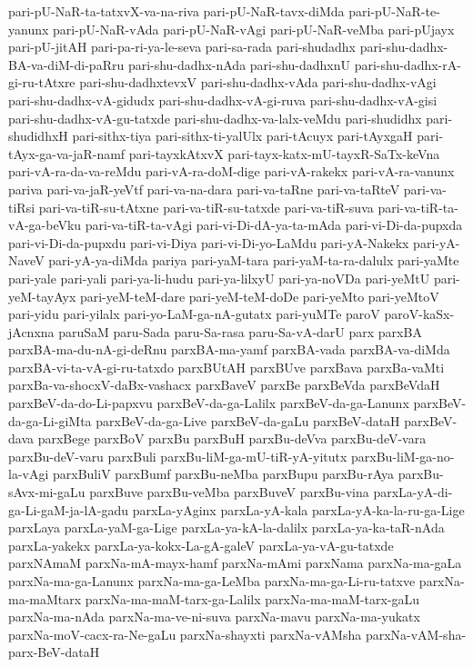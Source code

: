 {pari-pU-NaR-ta-tatxvX-va-na-riva
pari-pU-NaR-tavx-diMda
pari-pU-NaR-te-yanunx
pari-pU-NaR-vAda
pari-pU-NaR-vAgi
pari-pU-NaR-veMba
pari-pUjayx
pari-pU-jitAH
pari-pa-ri-ya-le-seva
pari-sa-rada
pari-shudadhx
pari-shu-dadhx-BA-va-diM-di-paRru
pari-shu-dadhx-nAda
pari-shu-dadhxnU
pari-shu-dadhx-rA-gi-ru-tAtxre
pari-shu-dadhxtevxV
pari-shu-dadhx-vAda
pari-shu-dadhx-vAgi
pari-shu-dadhx-vA-gidudx
pari-shu-dadhx-vA-gi-ruva
pari-shu-dadhx-vA-gisi
pari-shu-dadhx-vA-gu-tatxde
pari-shu-dadhx-va-lalx-veMdu
pari-shudidhx
pari-shudidhxH
pari-sithx-tiya
pari-sithx-ti-yalUlx
pari-tAcuyx
pari-tAyxgaH
pari-tAyx-ga-va-jaR-namf
pari-tayxkAtxvX
pari-tayx-katx-mU-tayxR-SaTx-keVna
pari-vA-ra-da-va-reMdu
pari-vA-ra-doM-dige
pari-vA-rakekx
pari-vA-ra-vanunx
pariva
pari-va-jaR-yeVtf
pari-va-na-dara
pari-va-taRne
pari-va-taRteV
pari-va-tiRsi
pari-va-tiR-su-tAtxne
pari-va-tiR-su-tatxde
pari-va-tiR-suva
pari-va-tiR-ta-vA-ga-beVku
pari-va-tiR-ta-vAgi
pari-vi-Di-dA-ya-ta-mAda
pari-vi-Di-da-pupxda
pari-vi-Di-da-pupxdu
pari-vi-Diya
pari-vi-Di-yo-LaMdu
pari-yA-Nakekx
pari-yA-NaveV
pari-yA-ya-diMda
pariya
pari-yaM-tara
pari-yaM-ta-ra-dalulx
pari-yaMte
pari-yale
pari-yali
pari-ya-li-hudu
pari-ya-lilxyU
pari-ya-noVDa
pari-yeMtU
pari-yeM-tayAyx
pari-yeM-teM-dare
pari-yeM-teM-doDe
pari-yeMto
pari-yeMtoV
pari-yidu
pari-yilalx
pari-yo-LaM-ga-nA-gutatx
pari-yuMTe
paroV
paroV-kaSx-jAcnxna
paruSaM
paru-Sada
paru-Sa-rasa
paru-Sa-vA-darU
parx
parxBA
parxBA-ma-du-nA-gi-deRnu
parxBA-ma-yamf
parxBA-vada
parxBA-va-diMda
parxBA-vi-ta-vA-gi-ru-tatxdo
parxBUtAH
parxBUve
parxBava
parxBa-vaMti
parxBa-va-shocxV-daBx-vashacx
parxBaveV
parxBe
parxBeVda
parxBeVdaH
parxBeV-da-do-Li-papxvu
parxBeV-da-ga-Lalilx
parxBeV-da-ga-Lanunx
parxBeV-da-ga-Li-giMta
parxBeV-da-ga-Live
parxBeV-da-gaLu
parxBeV-dataH
parxBeV-dava
parxBege
parxBoV
parxBu
parxBuH
parxBu-deVva
parxBu-deV-vara
parxBu-deV-varu
parxBuli
parxBu-liM-ga-mU-tiR-yA-yitutx
parxBu-liM-ga-no-la-vAgi
parxBuliV
parxBumf
parxBu-neMba
parxBupu
parxBu-rAya
parxBu-sAvx-mi-gaLu
parxBuve
parxBu-veMba
parxBuveV
parxBu-vina
parxLa-yA-di-ga-Li-gaM-ja-lA-gadu
parxLa-yAginx
parxLa-yA-kala
parxLa-yA-ka-la-ru-ga-Lige
parxLaya
parxLa-yaM-ga-Lige
parxLa-ya-kA-la-dalilx
parxLa-ya-ka-taR-nAda
parxLa-yakekx
parxLa-ya-kokx-La-gA-galeV
parxLa-ya-vA-gu-tatxde
parxNAmaM
parxNa-mA-mayx-hamf
parxNa-mAmi
parxNama
parxNa-ma-gaLa
parxNa-ma-ga-Lanunx
parxNa-ma-ga-LeMba
parxNa-ma-ga-Li-ru-tatxve
parxNa-ma-maMtarx
parxNa-ma-maM-tarx-ga-Lalilx
parxNa-ma-maM-tarx-gaLu
parxNa-ma-nAda
parxNa-ma-ve-ni-suva
parxNa-mavu
parxNa-ma-yukatx
parxNa-moV-cacx-ra-Ne-gaLu
parxNa-shayxti
parxNa-vAMsha
parxNa-vAM-sha-parx-BeV-dataH
}
